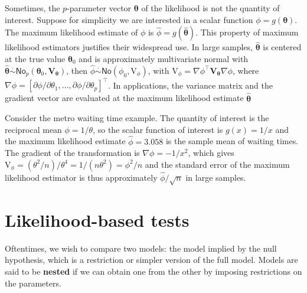 \documentclass[
  11pt,
  letterpaper,
]{book}
\theoremstyle{definition}
\theoremstyle{definition}
\theoremstyle{definition}
\theoremstyle{definition}
\theoremstyle{remark}
\begin{document}
Sometimes, the \(p\)-parameter vector \(\boldsymbol{\theta}\) of the likelihood is not the quantity of interest. Suppose for simplicity we are interested in a scalar function \(\phi = g(\boldsymbol{\theta})\). The maximum likelihood estimate of \(\phi\) is \(\widehat{\phi}=g(\widehat{\boldsymbol{\theta}})\). This property of maximum likelihood estimators justifies their widespread use. In large samples, \(\widehat{\boldsymbol{\theta}}\) is centered at the true value \(\boldsymbol{\theta}_0\) and is approximately multivariate normal with \(\widehat{\boldsymbol{\theta}} \stackrel{\cdot}{\sim} \mathsf{No}_p(\boldsymbol{\theta}_0, \mathbf{V}_{\boldsymbol{\theta}})\), then
\(\widehat{\phi} \stackrel{\cdot}{\sim}\mathsf{No}(\phi_0, \mathrm{V}_\phi)\), with \(\mathrm{V}_\phi = \nabla \phi^\top \mathbf{V}_{\boldsymbol{\theta}} \nabla \phi\), where \(\nabla \phi=[\partial \phi/\partial \theta_1, \ldots, \partial \phi/\partial \theta_p]^\top\). In applications, the variance matrix and the gradient vector are evaluated at the maximum likelihood estimate \(\widehat{\boldsymbol{\theta}}\)

Consider the metro waiting time example. The quantity of interest is the reciprocal mean \(\phi = 1/\theta\), so the scalar function of interest is \(g(x) = 1/x\) and the maximum likelihood estimate \(\hat{\phi}=3.058\) is the sample mean of waiting times. The gradient of the transformation is \(\nabla \phi = -1/x^2\), which gives \(\mathrm{V}_\phi = (\theta^2/n)/\theta^4 = 1/(n\theta^2) = \phi^2/n\) and the standard error of the maximum likelihood estimator is thus approximately \(\widehat{\phi}/\sqrt{n}\) in large samples.

\hypertarget{liktests}{%
\section{Likelihood-based tests}\label{liktests}}

Oftentimes, we wish to compare two models: the model implied by the null hypothesis, which is a restriction or simpler version of the full model. Models are said to be \textbf{nested} if we can obtain one from the other by imposing restrictions on the parameters.
\end{document}
